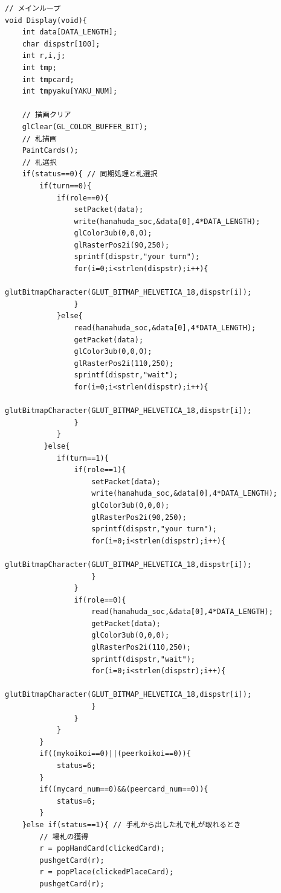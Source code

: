 \documentclass[a4j]{jarticle}
\begin{document}
    \begin{lstlisting}[basicstyle=\ttfamily\footnotesize, frame=single,label=display,caption=Display関数]
// メインループ
void Display(void){
    int data[DATA_LENGTH];
    char dispstr[100];
    int r,i,j;
    int tmp;
    int tmpcard;
    int tmpyaku[YAKU_NUM];

    // 描画クリア
    glClear(GL_COLOR_BUFFER_BIT);
    // 札描画
    PaintCards();
    // 札選択
    if(status==0){ // 同期処理と札選択
        if(turn==0){
            if(role==0){
                setPacket(data);
                write(hanahuda_soc,&data[0],4*DATA_LENGTH);
                glColor3ub(0,0,0);
                glRasterPos2i(90,250);
                sprintf(dispstr,"your turn");
                for(i=0;i<strlen(dispstr);i++){
                    glutBitmapCharacter(GLUT_BITMAP_HELVETICA_18,dispstr[i]);
                }
            }else{
                read(hanahuda_soc,&data[0],4*DATA_LENGTH);
                getPacket(data);
                glColor3ub(0,0,0);
                glRasterPos2i(110,250);
                sprintf(dispstr,"wait");
                for(i=0;i<strlen(dispstr);i++){
                    glutBitmapCharacter(GLUT_BITMAP_HELVETICA_18,dispstr[i]);
                }
            }
         }else{
            if(turn==1){
                if(role==1){
                    setPacket(data);
                    write(hanahuda_soc,&data[0],4*DATA_LENGTH);
                    glColor3ub(0,0,0);
                    glRasterPos2i(90,250);
                    sprintf(dispstr,"your turn");
                    for(i=0;i<strlen(dispstr);i++){
                        glutBitmapCharacter(GLUT_BITMAP_HELVETICA_18,dispstr[i]);
                    }
                }
                if(role==0){
                    read(hanahuda_soc,&data[0],4*DATA_LENGTH);
                    getPacket(data);
                    glColor3ub(0,0,0);
                    glRasterPos2i(110,250);
                    sprintf(dispstr,"wait");
                    for(i=0;i<strlen(dispstr);i++){
                        glutBitmapCharacter(GLUT_BITMAP_HELVETICA_18,dispstr[i]);
                    }
                }    
            }
        }
        if((mykoikoi==0)||(peerkoikoi==0)){
            status=6;
        }
        if((mycard_num==0)&&(peercard_num==0)){
            status=6;
        }
    }else if(status==1){ // 手札から出した札で札が取れるとき
        // 場札の獲得
        r = popHandCard(clickedCard);
        pushgetCard(r);
        r = popPlace(clickedPlaceCard);
        pushgetCard(r);


\end{lstlisting}
\end{document}
